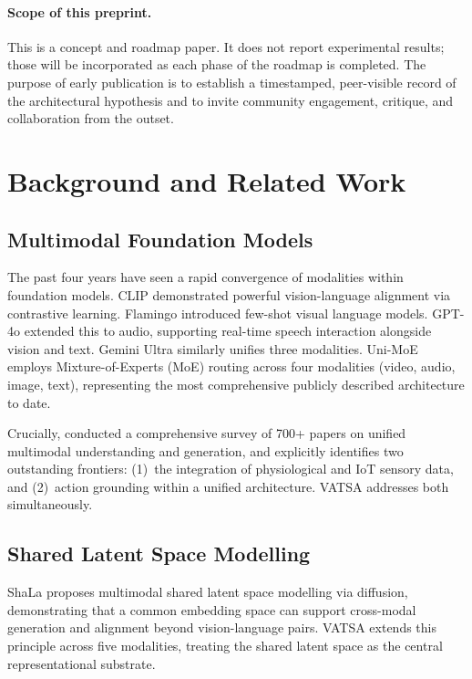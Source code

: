 \documentclass[11pt,a4paper]{article}
\begin{document}
\paragraph{Scope of this preprint.}
This is a concept and roadmap paper.  It does not report experimental results; those will
be incorporated as each phase of the roadmap is completed.  The purpose of early
publication is to establish a timestamped, peer-visible record of the architectural
hypothesis and to invite community engagement, critique, and collaboration from the
outset.

\section{Background and Related Work}
\label{sec:related}

\subsection{Multimodal Foundation Models}

The past four years have seen a rapid convergence of modalities within foundation
models.  CLIP \citep{radford2021clip} demonstrated powerful vision-language alignment
via contrastive learning.  Flamingo \citep{alayrac2022flamingo} introduced few-shot
visual language models.  GPT-4o \citep{openai2024gpt4o} extended this to audio,
supporting real-time speech interaction alongside vision and text.  Gemini Ultra
similarly unifies three modalities.  Uni-MoE \citep{li2024unimoe} employs
Mixture-of-Experts (MoE) routing across four modalities (video, audio, image, text),
representing the most comprehensive publicly described architecture to date.

Crucially, \citet{yang2025survey} conducted a comprehensive survey of 700+ papers on
unified multimodal understanding and generation, and explicitly identifies two
outstanding frontiers: (1)~the integration of physiological and IoT sensory data, and
(2)~action grounding within a unified architecture.  VATSA addresses both
simultaneously.

\subsection{Shared Latent Space Modelling}

ShaLa \citep{cui2025shala} proposes multimodal shared latent space modelling via
diffusion, demonstrating that a common embedding space can support cross-modal
generation and alignment beyond vision-language pairs.  VATSA extends this principle
across five modalities, treating the shared latent space as the central representational
substrate.
\end{document}
